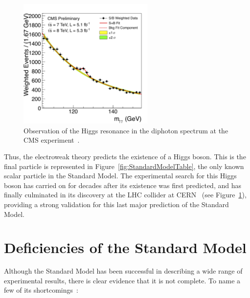 \begin{figure}
   \begin{center}
      \includegraphics[width=0.6\textwidth]{figures/higgs-resonance}
      \caption{Observation of the Higgs resonance in the diphoton spectrum at the CMS experiment~\cite{Chatrchyan:2012ufa}.}
      \label{fig:higgs-resonance}
   \end{center}
\end{figure}

Thus, the electroweak theory predicts the existence of a Higgs boson. This is the final particle is represented in Figure~\ref{fig:StandardModelTable}, the only known scalar particle in the Standard Model. The experimental search for this Higgs boson has carried on for decades after its existence was first predicted, and has finally culminated in its discovery at the LHC collider at CERN~\cite{Aad:2012tfa,Chatrchyan:2012ufa} (see Figure~\ref{fig:higgs-resonance}), providing a strong validation for this last major prediction of the Standard Model.

\section{Deficiencies of the Standard Model\label{sec:SMdeficiencies}}

Although the Standard Model has been successful in describing a wide range of experimental results, there is clear evidence that it is not complete. To name a few of its shortcomings~\cite{BettiniPhysics}:

